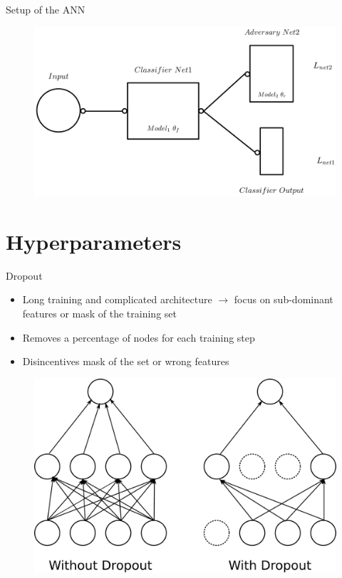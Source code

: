 \documentclass[12pt]{beamer}
\begin{document}
\begin{frame}{Setup of the ANN}
    \begin{figure}
        \centering
        \includegraphics[width=\textwidth]{ANN_sketch.png}
        \label{fig:my_label}
    \end{figure}
\end{frame}

\section{Hyperparameters}



\begin{frame}{Dropout}
\begin{itemize}
    \item Long training and complicated architecture $\rightarrow$ focus on sub-dominant features or mask of the training set
    \item Removes a percentage of nodes for each training step
    \item Disincentives mask of the set or wrong features 
\end{itemize}
\begin{figure}
    \centering
    \includegraphics[scale = 0.05]{dropout.eps}
    \label{fig:my_label}
\end{figure}
\end{frame}
\end{document}
